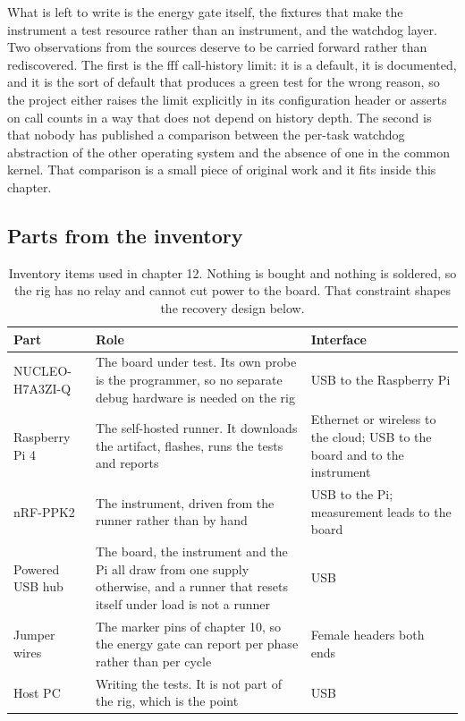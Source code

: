 What is left to write is the energy gate itself, the fixtures that make the
instrument a test resource rather than an instrument, and the watchdog layer.
Two observations from the sources deserve to be carried forward rather than
rediscovered. The first is the fff call-history limit: it is a default, it is
documented, and it is the sort of default that produces a green test for the
wrong reason, so the project either raises the limit explicitly in its
configuration header or asserts on call counts in a way that does not depend on
history depth. The second is that nobody has published a comparison between the
per-task watchdog abstraction of the other operating system and the absence of
one in the common kernel. That comparison is a small piece of original work and
it fits inside this chapter.

\subsection*{Parts from the inventory}

\begin{table}[H]\centering\small
\begin{tabular}{p{40mm}p{66mm}p{40mm}}
\toprule
Part & Role & Interface \\
\midrule
NUCLEO-H7A3ZI-Q & The board under test. Its own probe is the programmer, so no separate debug hardware is needed on the rig & USB to the Raspberry Pi \\
Raspberry Pi 4 & The self-hosted runner. It downloads the artifact, flashes, runs the tests and reports & Ethernet or wireless to the cloud; USB to the board and to the instrument \\
nRF-PPK2 & The instrument, driven from the runner rather than by hand & USB to the Pi; measurement leads to the board \\
Powered USB hub & The board, the instrument and the Pi all draw from one supply otherwise, and a runner that resets itself under load is not a runner & USB \\
Jumper wires & The marker pins of chapter 10, so the energy gate can report per phase rather than per cycle & Female headers both ends \\
Host PC & Writing the tests. It is not part of the rig, which is the point & USB \\
\bottomrule
\end{tabular}
\caption{Inventory items used in chapter 12. Nothing is bought and nothing is soldered, so the rig has no relay and cannot cut power to the board. That constraint shapes the recovery design below.}
\end{table}

